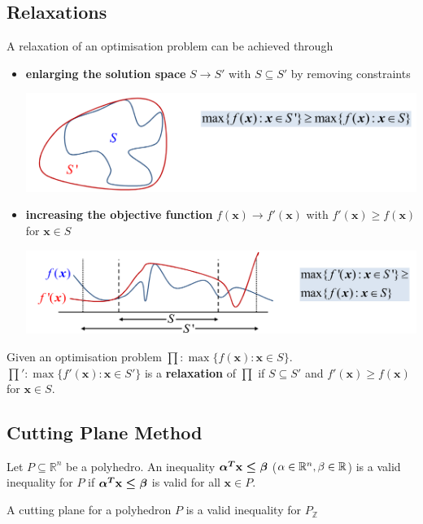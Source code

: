 \documentclass[11pt]{article}
\begin{document}
\subsection{Relaxations}
A relaxation of an optimisation problem can be achieved through
\begin{itemize}
	\item \textbf{enlarging the solution space} $S\rightarrow S'$ with $S\subseteq S'$ by removing constraints\\
	\begin{center}
		\includegraphics[width=0.6\linewidth]{img/enlarging_solution_space}
	\end{center}
	\item \textbf{increasing the objective function} $f(\textbf{x})\rightarrow f'(\textbf{x})$ with $f'(\textbf{x}) \geq f(\textbf{x})$ for $\textbf{x}\in S$\\
	\begin{center}
		\includegraphics[width=0.6\linewidth]{img/increasing_objective_function}
	\end{center}
\end{itemize}

\begin{theorem}
	Given an optimisation problem $\prod: \max\{ f(\textbf{x}):\textbf{x} \in S \}$. $\prod': \max\{ f'(\textbf{x}):\textbf{x} \in S' \}$ is a \textbf{relaxation} of $\prod$ if $S\subseteq S'$ and $f'(\textbf{x})\geq f(\textbf{x})$ for $\textbf{x}\in S$.
\end{theorem}

\subsection{Cutting Plane Method}
\begin{theorem}
	Let $P\subseteq \mathbb{R}^n$ be a polyhedro. An inequality $\boldmath{\alpha}^T \textbf{x} \leq \beta$ ($\boldmath{\alpha} \in \mathbb{R}^n, \beta\in\mathbb{R}$) is a {\color{Blue1}valid inequality} for $P$ if $\boldmath{\alpha}^T \textbf{x} \leq \beta$ is valid for all $\textbf{x} \in P$.
	
	A {\color{Blue1}cutting plane} for a polyhedron $P$ is a valid inequality for $P_{\mathbb{Z}}$
\end{theorem}
\end{document}
